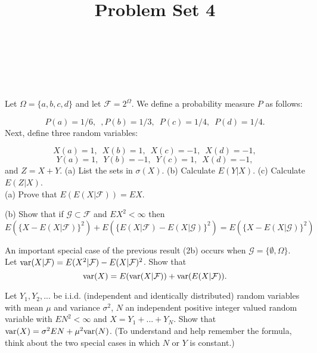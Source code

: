 \documentclass[10pt]{amsart}
\begin{document}
\noindent
{} \\
 \\
 \\
\title{Problem Set 4}
\maketitle

 Let $\Omega=\{a,b,c,d\}$ and let $\mathcal{F}=2^{\Omega}$. We define a probability measure $P$ as follows:

$$P({a})=1/6, \,\,\,, P({b})=1/3, \,\,\, P({c})=1/4, \,\,\, P({d})=1/4.$$
Next, define three random variables:

$$X(a)=1, \,\,\, X(b)=1, \,\,\, X(c)=-1, \,\,\,  X(d)=-1,$$
$$Y(a)=1, \,\,\, Y(b)=-1, \,\,\, Y(c)=1, \,\,\,  X(d)=-1,$$
and $Z=X+Y$.
(a) List the sets in $\sigma(X)$. (b) Calculate $E(Y|X)$. (c) Calculate $E(Z|X)$.
\\

 (a) Prove that $E(E(X|\mathcal{F}))=EX$. 

(b) Show that if $\mathcal{G}\subset \mathcal{F}$ and $EX^2<\infty$ then
$$E(\{X-E(X|\mathcal{F})\}^2)+ E(\{E(X|\mathcal{F})-E(X|\mathcal{G})\}^2)=E(\{X-E(X|\mathcal{G})\}^2)$$ 

 An important special case of the previous result (2b) occurs when $\mathcal{G} = \{\emptyset, \Omega \}$.  Let ${\rm var}(X|\mathcal{F})=E(X^2|\mathcal{F})-E(X|\mathcal{F})^2$. Show that 
$${\rm var}(X)=E({\rm var}(X|\mathcal{F}))+{\rm var}(E(X|\mathcal{F})).$$


  Let $Y_1, Y_2, . . .$ be i.i.d. (independent and identically distributed) random variables with mean $\mu$ and variance $\sigma^2$, $N$ an independent positive integer valued random variable with $EN^2 < \infty$ and $X = Y_1 +...+Y_N$. Show that ${\rm var}(X) = \sigma^2 EN + \mu^2 {\rm var}(N)$. (To understand and help remember the formula, think about the two special cases in which $N$ or $Y$ is constant.)
\end{document}
